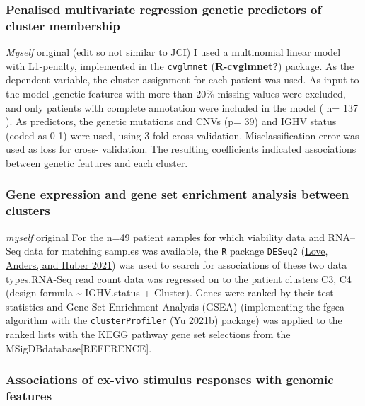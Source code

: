 \documentclass[11pt, a4paper, twosided]{book}
\begin{document}
\hypertarget{penalised-multivariate-regression-genetic-predictors-of-cluster-membership}{%
\subsubsection{Penalised multivariate regression genetic predictors of cluster membership}\label{penalised-multivariate-regression-genetic-predictors-of-cluster-membership}}

\emph{Myself} original (edit so not similar to JCI)
I used a multinomial linear model with L1-penalty, implemented in the \texttt{cvglmnet} (\protect\hyperlink{ref-R-cvglmnet}{\textbf{R-cvglmnet?}}) package. As the dependent variable, the cluster assignment for each patient was used. As input to the model ,genetic features with more than 20\% missing values were excluded, and only patients with complete annotation were included in the model ( n= 137 ). As predictors, the genetic mutations and CNVs (p= 39) and IGHV status (coded as 0-1) were used, using 3-fold cross-validation. Misclassification error was used as loss for cross- validation. The resulting coefficients indicated associations between genetic features and each cluster.

\hypertarget{gene-expression-and-gene-set-enrichment-analysis-between-clusters}{%
\subsubsection{Gene expression and gene set enrichment analysis between clusters}\label{gene-expression-and-gene-set-enrichment-analysis-between-clusters}}

\emph{myself} original
For the n=49 patient samples for which viability data and RNA--Seq data for matching samples was available, the \texttt{R} package \texttt{DESeq2} (\protect\hyperlink{ref-R-DESeq2}{Love, Anders, and Huber 2021}) was used to search for associations of these two data types.RNA-Seq read count data was regressed on to the patient clusters C3, C4 (design formula \textasciitilde{} IGHV.status + Cluster). Genes were ranked by their test statistics and Gene Set Enrichment Analysis (GSEA) (implementing the fgsea algorithm with the \texttt{clusterProfiler} (\protect\hyperlink{ref-R-clusterProfiler}{Yu 2021b}) package) was applied to the ranked lists with the KEGG pathway gene set selections from the MSigDBdatabase{[}REFERENCE{]}.

\hypertarget{associations-of-ex-vivo-stimulus-responses-with-genomic-features}{%
\subsubsection{Associations of ex-vivo stimulus responses with genomic features}\label{associations-of-ex-vivo-stimulus-responses-with-genomic-features}}
\end{document}
